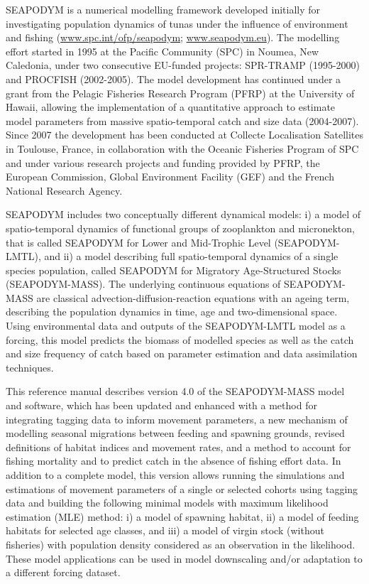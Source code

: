 \documentclass[a4paper,12pt,twoside]{book}
\begin{document}
SEAPODYM is a numerical modelling framework developed initially for investigating population dynamics of tunas under the influence of environment and fishing (\url{www.spc.int/ofp/seapodym}; \url{www.seapodym.eu}). The modelling effort started in 1995 at the Pacific Community (SPC) in Noumea, New Caledonia, under two consecutive EU-funded projects: SPR-TRAMP (1995-2000) and PROCFISH (2002-2005). The model development has continued under a grant from the Pelagic Fisheries Research Program (PFRP) at the University of Hawaii, allowing the implementation of a quantitative approach to estimate model parameters from massive spatio-temporal catch and size data (2004-2007). Since 2007 the development has been conducted at Collecte Localisation Satellites in Toulouse, France, in collaboration with the Oceanic Fisheries Program of SPC and under various research projects and funding provided by PFRP, the European Commission, Global Environment Facility (GEF) and the French National Research Agency. 

SEAPODYM includes two conceptually different dynamical models: i) a model of spatio-temporal dynamics of functional groups of zooplankton and micronekton, that is called SEAPODYM for Lower and Mid-Trophic Level (SEAPODYM-LMTL), and ii) a model describing full spatio-temporal dynamics of a single species population, called SEAPODYM for Migratory Age-Structured Stocks (SEAPODYM-MASS). The underlying continuous equations of SEAPODYM-MASS are classical advection-diffusion-reaction equations with an ageing term, describing the population dynamics in time, age and two-dimensional space. Using environmental data and outputs of the SEAPODYM-LMTL model as a forcing, this model predicts the biomass of modelled species as well as the catch and size frequency of catch based on parameter estimation and data assimilation techniques.

This reference manual describes version 4.0 of the SEAPODYM-MASS model and software, which has been updated and enhanced with a method for integrating tagging data to inform movement parameters, a new mechanism of modelling seasonal migrations between feeding and spawning grounds, revised definitions of habitat indices and movement rates, and a method to account for fishing mortality and to predict catch in the absence of fishing effort data. In addition to a complete model, this version allows running the simulations and estimations of movement parameters of a single or selected cohorts using tagging data and building the following minimal models with maximum likelihood estimation (MLE) method: i) a model of spawning habitat, ii) a model of feeding habitats for selected age classes, and iii) a model of virgin stock (without fisheries) with population density considered as an observation in the likelihood. These model applications can be used in model downscaling and/or adaptation to a different forcing dataset.
\end{document}
